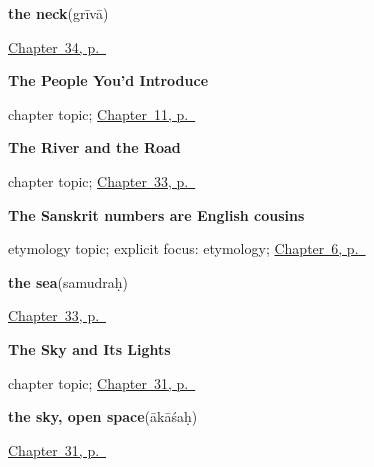 \noindent\begin{minipage}[t]{\linewidth}
\raggedright
\textbf{the neck}\enspace\emph{}\enspace(grīvā)\par
\footnotesize \hyperref[ch:sa-limbs]{Chapter~34, p.~\pageref*{ch:sa-limbs}}
\end{minipage}\par\smallskip

\noindent\begin{minipage}[t]{\linewidth}
\raggedright
\textbf{The People You'd Introduce}\par
\footnotesize chapter topic; \hyperref[ch:sa-people-nouns]{Chapter~11, p.~\pageref*{ch:sa-people-nouns}}
\end{minipage}\par\smallskip

\noindent\begin{minipage}[t]{\linewidth}
\raggedright
\textbf{The River and the Road}\par
\footnotesize chapter topic; \hyperref[ch:sa-land]{Chapter~33, p.~\pageref*{ch:sa-land}}
\end{minipage}\par\smallskip

\noindent\begin{minipage}[t]{\linewidth}
\raggedright
\textbf{The Sanskrit numbers are English cousins}\par
\footnotesize etymology topic; explicit focus: etymology; \hyperref[ch:numbers-one-to-five]{Chapter~6, p.~\pageref*{ch:numbers-one-to-five}}
\end{minipage}\par\smallskip

\noindent\begin{minipage}[t]{\linewidth}
\raggedright
\textbf{the sea}\enspace\emph{}\enspace(samudraḥ)\par
\footnotesize \hyperref[ch:sa-land]{Chapter~33, p.~\pageref*{ch:sa-land}}
\end{minipage}\par\smallskip

\noindent\begin{minipage}[t]{\linewidth}
\raggedright
\textbf{The Sky and Its Lights}\par
\footnotesize chapter topic; \hyperref[ch:sa-sky]{Chapter~31, p.~\pageref*{ch:sa-sky}}
\end{minipage}\par\smallskip

\noindent\begin{minipage}[t]{\linewidth}
\raggedright
\textbf{the sky, open space}\enspace\emph{}\enspace(ākāśaḥ)\par
\footnotesize \hyperref[ch:sa-sky]{Chapter~31, p.~\pageref*{ch:sa-sky}}
\end{minipage}\par\smallskip

